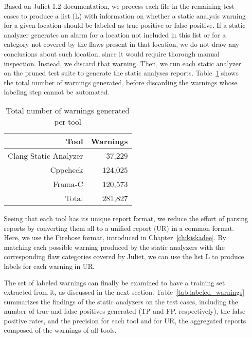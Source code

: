 Based on Juliet 1.2 documentation, we process each file in the remaining test
cases to produce a list (L) with information on whether a static analysis
warning for a given location should be labeled as true positive or false
positive. If a static analyzer generates an alarm for a location not included
in this list or for a category not covered by the flaws present in that location, we do not
draw any conclusions about such location, since it would require thorough
manual inspection. Instead, we discard that warning. Then, we run each static
analyzer on the pruned test suite to generate the static analyses reports.
Table~\ref{tab:unlabeled_warnings} shows the total number of warnings
generated, before discarding the warnings whose labeling step cannot be
automated.

  \begin{table}
    \begin{center}
        \begin{tabular}{rr}\hline
          Tool & Warnings \\
        \hline
          Clang Static Analyzer & 37,229 \\
          Cppcheck & 124,025 \\
          Frama-C & 120,573 \\
          Total & 281,827 \\ \hline
        \end{tabular}
        \caption{Total number of warnings generated per tool}\label{tab:unlabeled_warnings}
    \end{center}
\end{table}

Seeing that each tool has its unique report format, we reduce the effort of
parsing reports by converting them all to a unified report (UR) in a common
format. Here, we use the Firehose format, introduced in
Chapter~\ref{ch:kiskadee}.  By matching each possible warning produced by the
static analyzers with the corresponding flaw categories covered by Juliet, we
can use the list L to produce labels for each warning in UR.

The set of labeled warnings can finally be examined to have a training set
extracted from it, as discussed in the next section.
Table~\ref{tab:labeled_warnings} summarizes the findings of the static
analyzers on the test cases, including the number of true and false positives
generated (TP and FP, respectively), the false positive rates, and the precision
for each tool and for UR, the aggregated reports composed of the warnings of
all tools.

